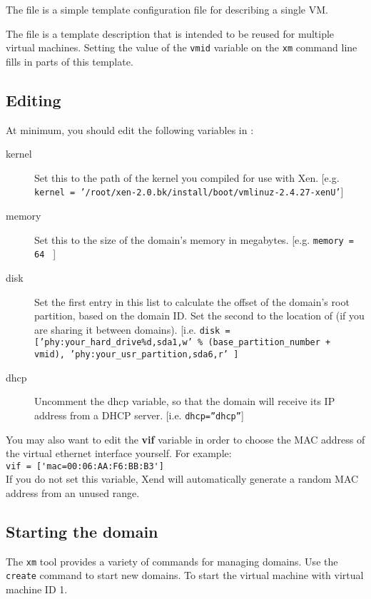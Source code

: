 \documentclass[11pt,twoside,final,openright]{xenstyle}
\begin{document}
The  file is a simple template configuration file
for describing a single VM.

The  file is a template description that is intended
to be reused for multiple virtual machines.  Setting the value of the
{\tt vmid} variable on the {\tt xm} command line
fills in parts of this template.

\subsection{Editing }

At minimum, you should edit the following variables in :

\begin{description}
\item[kernel] Set this to the path of the kernel you compiled for use
              with Xen. [e.g. {\tt kernel =
              '/root/xen-2.0.bk/install/boot/vmlinuz-2.4.27-xenU'}]
\item[memory] Set this to the size of the domain's memory in
megabytes. [e.g. {\tt memory = 64 } ]
\item[disk] Set the first entry in this list to calculate the offset
of the domain's root partition, based on the domain ID.  Set the
second to the location of  (if you are sharing it between
domains). [i.e. {\tt disk = ['phy:your\_hard\_drive\%d,sda1,w' \%
(base\_partition\_number + vmid), 'phy:your\_usr\_partition,sda6,r' ]}
\item[dhcp] Uncomment the dhcp variable, so that the domain will
receive its IP address from a DHCP server. [i.e. {\tt dhcp=''dhcp''}]
\end{description}

You may also want to edit the {\bf vif} variable in order to choose
the MAC address of the virtual ethernet interface yourself.  For
example: \\ \verb_vif = ['mac=00:06:AA:F6:BB:B3']_\\ If you do not set
this variable, Xend will automatically generate a random MAC address
from an unused range.

\subsection{Starting the domain}

The {\tt xm} tool provides a variety of commands for managing domains.
Use the {\tt create} command to start new domains.  To start the
virtual machine with virtual machine ID 1.
\end{document}
